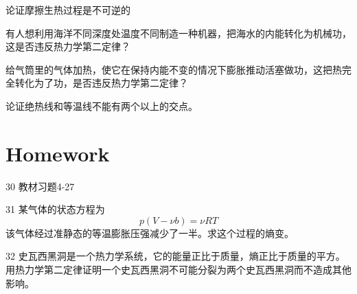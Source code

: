 \documentclass[CJK]{beamer}
\begin{document}
\begin{frame}
\bch


\bitem
\item{论证摩擦生热过程是不可逆的}
\eitem

\ech
\end{frame}

\begin{frame}
\bch


\bitem
\item{有人想利用海洋不同深度处温度不同制造一种机器，把海水的内能转化为机械功，这是否违反热力学第二定律？}
\eitem

\ech
\end{frame}


\begin{frame}
\bch


\bitem
\item{给气筒里的气体加热，使它在保持内能不变的情况下膨胀推动活塞做功，这把热完全转化为了功，是否违反热力学第二定律？}
\eitem
\ech
\end{frame}


\begin{frame}
\bch


\bitem
\item{论证绝热线和等温线不能有两个以上的交点。}
\eitem
\ech
\end{frame}


\section{Homework}

\begin{frame}
\bch

\bitem
\item[30]{教材习题4-27}
\item[31]{某气体的状态方程为
$$p(V- \nu b) = \nu RT$$
该气体经过准静态的等温膨胀压强减少了一半。求这个过程的熵变。}
\item[32]{史瓦西黑洞是一个热力学系统，它的能量正比于质量，熵正比于质量的平方。用热力学第二定律证明一个史瓦西黑洞不可能分裂为两个史瓦西黑洞而不造成其他影响。}
\eitem

\ech
\end{frame}
\end{document}
